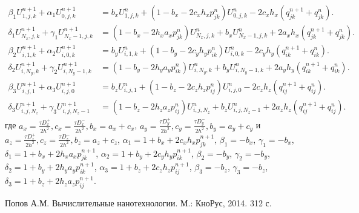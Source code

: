 \documentclass[a4paper,12pt]{article}
\begin{document}
\begin{align*}
  \beta_1 U^{n+1}_{1,j,k} + \alpha_1 U^{n+1}_{0,j,k} &=
  b_x U^{n}_{1,j,k} + \left(1 - b_x - 2 c_x h_x p^{n}_{jk} \right) U^{n}_{0,j,k} -
  2 c_x h_x (q_{jk}^{n+1} + q_{jk}^{n}). \\
  \delta_1 U^{n+1}_{N_x,j,k} + \gamma_1 U^{n+1}_{N_x-1,j,k} &=
  \left(1 - b_x - 2 h_x a_x p^{n}_{jk} \right) U^{n}_{N_x,j,k} + b_x U^{n}_{N_x-1,j,k} +
  2 a_x h_x \left( q_{jk}^{n+1} + q_{jk}^{n} \right). \\
  \beta_2 U^{n+1}_{i,1,k} + \alpha_2 U^{n+1}_{i,0,k} &=
  b_y U^{n}_{i,1,k} + \left(1 - b_y - 2 c_y h_y p^{n}_{ik} \right) U^{n}_{i,0,k} -
  2 c_y h_y (q_{ik}^{n+1} + q_{ik}^{n}). \\
  \delta_2 U^{n+1}_{i,N_y,k}  + \gamma_2 U^{n+1}_{i,N_y-1,k} &=
  \left(1 - b_y - 2 h_y a_yp^{n}_{ik} \right) U^{n}_{i,N_y,k} + b_y U^{n}_{i,N_y-1,k} +
  2 a_y h_y \left( q_{ik}^{n+1} + q_{ik}^{n} \right). \\
  \beta_3 U^{n+1}_{i,j,1} + \alpha_3 U^{n+1}_{i,j,0} &=
  b_z U^{n}_{i,j,1} + \left(1 - b_z - 2 c_z h_z p^{n}_{ij} \right) U^{n}_{i,j,0} -
  2 c_z h_z (q_{ij}^{n+1} + q_{ij}^{n}). \\
  \delta_3 U^{n+1}_{i,j,N_z} + \gamma_3 U^{n+1}_{i,j,N_z-1} &=
  \left(1 - b_z - 2 h_z a_z p^{n}_{ij}\right) U^{n}_{i,j,N_z} + b_z U^{n}_{i,j,N_z-1} +
  2 a_z h_z \left( q_{ij}^{n+1} + q_{ij}^{n} \right).
\end{align*}
где $a_x = \frac{\tau D^+_x}{2h^2}, c_x = \frac{\tau D^-_x}{2h^2}, b_x = a_x + c_x$, $a_y = \frac{\tau D^+_y}{2h^2}, c_y = \frac{\tau D^-_y}{2h^2}, b_y = a_y + c_y$ и $a_z = \frac{\tau D^+_z}{2h^2}, c_z = \frac{\tau D^-_z}{2h^2}, b_z = a_z + c_z$,
$\alpha_1 = 1 + b_x  + 2 c_x h_x p^{n+1}_{jk} $, $ \beta_1 = - b_x$, $\gamma_1 = -b_x$, $\delta_1 = 1 + b_x + 2 h_x a_x p^{n+1}_{jk}$, $\alpha_2 = 1 + b_y  + 2 c_y h_y p^{n+1}_{ik}$, $ \beta_2 = - b_y$, $\gamma_2 = -b_y$, $\delta_2 = 1 + b_y + 2 h_y a_y p^{n+1}_{ik}$, $\alpha_3 = 1 + b_z  + 2 c_z h_z p^{n+1}_{ij}$, $ \beta_3 = - b_z$, $\gamma_3 = - b_z$, $\delta_3 =  1 + b_z + 2 h_z a_z p^{n+1}_{ij}$.

\hrulefill

\begin{thebibliography}{99}
 Попов А.М.
  Вычислительные нанотехнологии. М.: КноРус, 2014. 312 с.
\end{thebibliography}
\end{document}
